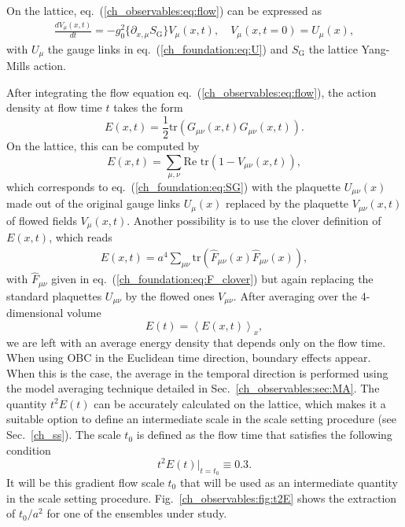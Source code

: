 On the lattice, eq.~(\ref{ch_observables:eq:flow}) can be expressed as 
\begin{align}
\frac{dV_{\mu}(x,t)}{dt}=-g_0^2\{\partial_{x,\mu}S_{\textrm{G}}\}V_{\mu}(x,t), \quad V_{\mu}(x,t=0)=U_{\mu}(x),
\end{align}
with $U_{\mu}$ the gauge links in eq.~(\ref{ch_foundation:eq:U}) and $S_{\textrm{G}}$ the lattice Yang-Mills action. 

After integrating the flow equation eq.~(\ref{ch_observables:eq:flow}), the action density at flow time $t$ takes the form
\begin{equation}
E(x,t)=\frac{1}{2}{\textrm{tr}}\left({G}_{\mu\nu}(x,t){G}_{\mu\nu}(x,t)\right).
\end{equation}
On the lattice, this can be computed by
\begin{equation}
E(x,t)=\sum_{\mu,\nu}\textrm{Re tr}\left(1-V_{\mu\nu}(x,t)\right),
\end{equation}
which corresponds to eq.~(\ref{ch_foundation:eq:SG}) with the plaquette $U_{\mu\nu}(x)$ made out of the original gauge links $U_{\mu}(x)$ replaced by the plaquette $V_{\mu\nu}(x,t)$ of flowed fields $V_{\mu}(x,t)$. Another possibility is to use the clover definition of $E(x,t)$, which reads
\begin{align}
\label{ch_observables:eq:E}
E(x,t)=a^4\sum_{\mu\nu}{\textrm{tr}}\left(\hat{F}_{\mu\nu}(x)\hat{F}_{\mu\nu}(x)\right),
\end{align}
with $\hat{F}_{\mu\nu}$ given in eq.~(\ref{ch_foundation:eq:F_clover}) but again replacing the standard plaquettes $U_{\mu\nu}$ by the flowed ones $V_{\mu\nu}$. After averaging over the 4-dimensional volume
\begin{equation}
E(t)=\left<E(x,t)\right>_x,
\end{equation}
we are left with an average energy density that depends only on the flow time. When using OBC in the Euclidean time direction, boundary effects appear. When this is the case, the average in the temporal direction is performed using the model averaging technique detailed in Sec.~\ref{ch_observables:sec:MA}. The quantity $t^2E(t)$ can be accurately calculated on the lattice, which makes it a suitable option to define an intermediate scale in the scale setting procedure (see Sec.~\ref{ch_ss}). The scale $t_0$ is defined as the flow time that satisfies the following condition
\begin{equation}
\label{ch_observables:eq:t0}
t^2E(t)|_{t=t_0}\equiv0.3.
\end{equation}
It will be this gradient flow scale $t_0$ that will be used as an intermediate quantity in the scale setting procedure. Fig.~\ref{ch_observables:fig:t2E} shows the extraction of $t_0/a^2$ for one of the ensembles under study.

